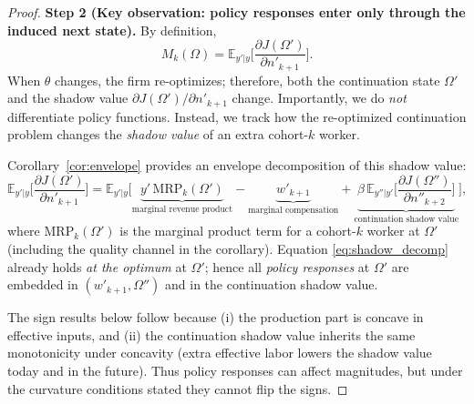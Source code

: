 \begin{proof}
\medskip
\noindent\textbf{Step 2 (Key observation: policy responses enter only through the induced next state).}
By definition,
\[
M_k(\Omega)=\mathbb E_{y'|y}\Big[\frac{\partial J(\Omega')}{\partial n'_{k+1}}\Big].
\]
When $\theta$ changes, the firm re-optimizes; therefore, both the continuation state $\Omega'$ and the shadow value
$\partial J(\Omega')/\partial n'_{k+1}$ change. Importantly, we do \emph{not} differentiate policy functions.
Instead, we track how the re-optimized continuation problem changes the \emph{shadow value} of an extra cohort-$k$ worker.

Corollary~\ref{cor:envelope} provides an envelope decomposition of this shadow value:
\begin{equation}\label{eq:shadow_decomp}
\mathbb E_{y'|y}\Big[\frac{\partial J(\Omega')}{\partial n'_{k+1}}\Big]
=
\mathbb E_{y'|y}\Big[
\underbrace{y'\,\text{MRP}_k(\Omega')}_{\text{marginal revenue product}}
-\underbrace{w'_{k+1}}_{\text{marginal compensation}}
+\underbrace{\beta\,\mathbb E_{y''|y'}\Big[\frac{\partial J(\Omega'')}{\partial n''_{k+2}}\Big]}_{\text{continuation shadow value}}
\Big],
\end{equation}
where $\text{MRP}_k(\Omega')$ is the marginal product term for a cohort-$k$ worker at $\Omega'$ (including the quality channel in the corollary).
Equation \eqref{eq:shadow_decomp} already holds \emph{at the optimum} at $\Omega'$; hence all \emph{policy responses} at $\Omega'$
are embedded in $(w'_{k+1},\Omega'')$ and in the continuation shadow value.

The sign results below follow because (i) the production part is concave in effective inputs, and (ii) the continuation shadow value
inherits the same monotonicity under concavity (extra effective labor lowers the shadow value today and in the future).
Thus policy responses can affect magnitudes, but under the curvature conditions stated they cannot flip the signs.


\end{proof}
